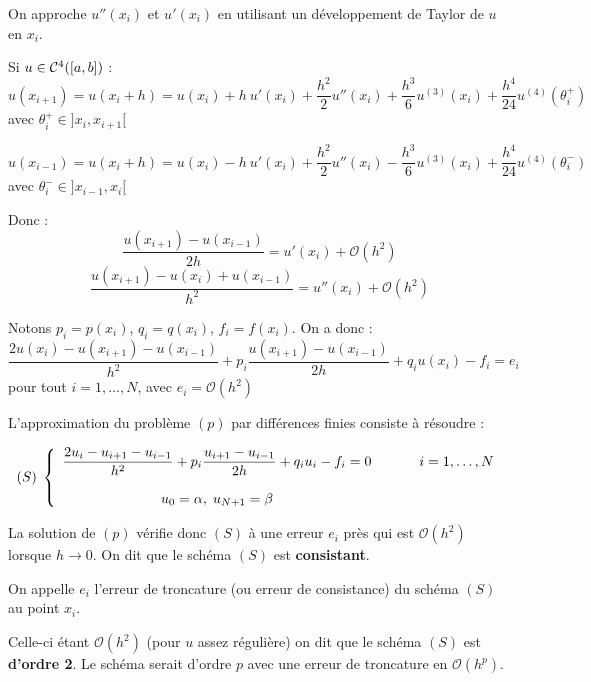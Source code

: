 On approche $u''(x_i)$ et $u'(x_i)$ en utilisant un développement de Taylor
de $u$ en $x_i$.

Si $u \in \mathcal{C}^4([a,b])$ :
\[
    u(x_{i+1}) = u(x_i + h) = u(x_i) + h \: u'(x_i) + \frac{h^2}{2} u''(x_i)
    + \frac{h^3}{6} u^{(3)}(x_i) + \frac{h^4}{24} u^{(4)}(\theta_i^+)
\]
\hfill avec $\theta_i^+ \in ]x_i,x_{i+1}[$

\[
    u(x_{i-1}) = u(x_i + h) = u(x_i) - h \: u'(x_i) + \frac{h^2}{2} u''(x_i)
    - \frac{h^3}{6} u^{(3)}(x_i) + \frac{h^4}{24} u^{(4)}(\theta_i^-)
\]
\hfill avec $\theta_i^- \in ]x_{i-1},x_i[$

    Donc :
    \[
        \frac{u(x_{i+1}) - u(x_{i-1})}{2h} =  u'(x_i) + \mathcal{O}(h^2)
    \]
    \[
        \frac{u(x_{i+1}) - u(x_i) + u(x_{i-1})}{h^2} =  u''(x_i) + \mathcal{O}(h^2)
    \]

    Notons $p_i = p(x_i)$, $q_i = q(x_i)$, $f_i = f(x_i)$. On a donc :
    \[
        \frac{2u(x_i) - u(x_{i+1}) - u(x_{i-1})}{h^2} + p_i \frac{u(x_{i+1}) - u(x_{i-1})}{2h} + q_i u(x_i) - f_i = e_i
    \]
    \hfill pour tout $i=1,\dots,N$, avec $e_i = \mathcal{O}(h^2)$

    L'approximation du problème $(p)$ par différences finies consiste à
    résoudre :

    \[
        (S) \;
        \left\lbrace
        \begin{array}{ccc}
            \dfrac{2u_i - u_{i+1} - u_{i-1}}{h^2} + p_i \dfrac{u_{i+1} - u_{i-1}}{2h} + q_i u_i - f_i = 0 & & \hspace{0.5cm} i=1,\dots,N \\ [15pt]
            u_0 = \alpha, \; u_{N+1} = \beta & &
        \end{array}
        \right.
    \]

    La solution de $(p)$ vérifie donc $(S)$ à une erreur $e_i$ près qui est
    $\mathcal{O}(h^2)$ lorsque $h \longrightarrow 0$. On dit que le schéma
    $(S)$ est \textbf{consistant}.

    On appelle $e_i$ l'erreur de troncature (ou erreur de consistance) du schéma
    $(S)$ au point $x_i$.

    Celle-ci étant $\mathcal{O}(h^2)$ (pour $u$ assez régulière) on dit que le schéma
    $(S)$ est \textbf{d'ordre 2}. Le schéma serait d'ordre $p$ avec une erreur
    de troncature en $\mathcal{O}(h^p)$.

